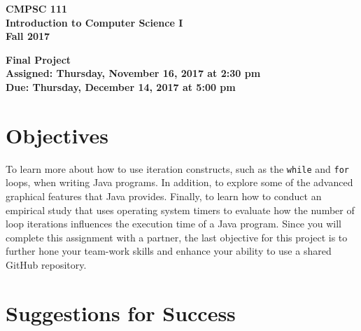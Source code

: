 \documentclass[11pt]{article}
\newcommand{\assignmentduedate}{December 14}
\newcommand{\assignmentassignedate}{November 16}
\newcommand{\labyear}{2017}
\newcommand{\labday}{Thursday}
\newcommand{\labtime}{2:30 pm}
\newcommand{\labduetime}{5:00 pm}
\newcommand{\assigneddate}{Assigned: \labday, \assignmentassignedate, \labyear{} at \labtime{}}
\newcommand{\duedate}{Due: \labday, \assignmentduedate, \labyear{} at \labduetime{}}
\newcommand{\labtitle}[1]
{
  \begin{center}
    \begin{center}
      \bf
      CMPSC 111\\Introduction to Computer Science I\\
      Fall 2017\\
      \medskip
    \end{center}
    \bf
    #1
  \end{center}
}
\begin{document}
\thispagestyle{empty}

\labtitle{Final Project \\ \assigneddate{} \\ \duedate{}}

\section*{Objectives}

To learn more about how to use iteration constructs, such as the {\tt while} and {\tt for} loops, when writing Java
programs. In addition, to explore some of the advanced graphical features that Java provides. Finally, to learn how to
conduct an empirical study that uses operating system timers to evaluate how the number of loop iterations influences
the execution time of a Java program. Since you will complete this assignment with a partner, the last objective for
this project is to further hone your team-work skills and enhance your ability to use a shared GitHub repository.

\section*{Suggestions for Success}
\end{document}
